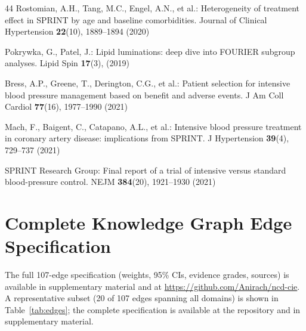 \documentclass[runningheads]{llncs}
\begin{document}
\begin{thebibliography}{44}
Rostomian, A.H., Tang, M.C., Engel, A.N., et al.:
Heterogeneity of treatment effect in SPRINT by age and
baseline comorbidities.
Journal of Clinical Hypertension \textbf{22}(10), 1889--1894 (2020)

Pokrywka, G., Patel, J.:
Lipid luminations: deep dive into FOURIER subgroup analyses.
Lipid Spin \textbf{17}(3), (2019)

Bress, A.P., Greene, T., Derington, C.G., et al.:
Patient selection for intensive blood pressure management
based on benefit and adverse events.
J Am Coll Cardiol \textbf{77}(16), 1977--1990 (2021)

Mach, F., Baigent, C., Catapano, A.L., et al.:
Intensive blood pressure treatment in coronary artery disease:
implications from SPRINT.
J Hypertension \textbf{39}(4), 729--737 (2021)

SPRINT Research Group:
Final report of a trial of intensive versus standard
blood-pressure control.
NEJM \textbf{384}(20), 1921--1930 (2021)

\end{thebibliography}

\appendix
\section{Complete Knowledge Graph Edge Specification}\label{app:edges}

The full 107-edge specification (weights, 95\% CIs, evidence grades,
sources) is available in supplementary material and at
\url{https://github.com/Anirach/ncd-cie}.
A representative subset (20 of 107 edges spanning all domains)
is shown in Table~\ref{tab:edges}; the complete specification is
available at the repository and in supplementary material.
\end{document}

